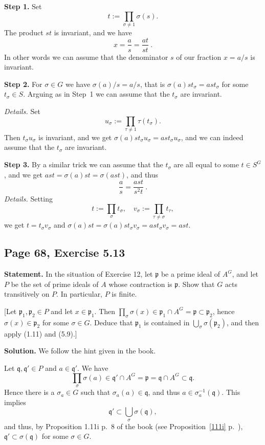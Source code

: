 \documentclass[parskip=half,fontsize=12pt]{scrartcl}%
\newcommand{\mf}{\mathfrak}
\newcommand{\ppp}{\mf p}
\newcommand{\qqq}{\mf q}
\begin{document}
\textbf{Step 1.} Set 
$$
t:=\prod_{\sigma\ne1}\sigma(s).
$$ 
The product $st$ is invariant, and we have 
$$
x=\frac{a}{s}=\frac{at}{st}\ .
$$ 
In other words we can assume that the denominator $s$ of our fraction $x=a/s$ is invariant.

\textbf{Step 2.} For $\sigma\in G$ we have $\sigma(a)/s=a/s$, that is $\sigma(a)st_\sigma=ast_\sigma$ for some $t_\sigma\in S$. Arguing as in Step~1 we can assume that the $t_\sigma$ are invariant. 

\emph{Details.} Set 
$$
u_\sigma:=\prod_{\tau\ne1}\tau(t_\sigma).
$$ 
Then $t_\sigma u_\sigma$ is invariant, and we get $\sigma(a)st_\sigma u_\sigma=ast_\sigma u_\sigma$, and we can indeed assume that the $t_\sigma$ are invariant.

\textbf{Step 3.} By a similar trick we can assume that the $t_\sigma$ are all equal to some $t\in S^G$, and we get $ast=\sigma(a)st=\sigma(ast)$, and thus 
$$
\frac{a}{s}=\frac{ast}{s^2t}\ .
$$ 
\emph{Details.} Setting 
$$
t:=\prod_\sigma t_\sigma,\quad v_\sigma:=\prod_{\tau\ne\sigma}t_\tau,
$$ 
we get $t=t_\sigma v_\sigma$ and $\sigma(a)st=\sigma(a)st_\sigma v_\sigma=ast_\sigma v_\sigma=ast$.

\subsection{Page 68, Exercise 5.13}%

\textbf{Statement.} In the situation of Exercise 12, let $\ppp$ be a prime ideal of $A^G$, and let $P$ be the set of prime ideals of $A$ whose contraction is $\ppp$. Show that $G$ acts transitively on $P$. In particular, $P$ is finite.

[Let $\ppp_1,\ppp_2\in P$ and let $x\in\ppp_1$. Then $\prod_\sigma\sigma(x)\in\ppp_1\cap A^G=\ppp\subset\ppp_2$, hence $\sigma(x)\in\ppp_2$ for some $\sigma\in G$. Deduce that $\ppp_1$ is contained in $\bigcup_\sigma\sigma(\ppp_2)$, and then apply (1.11) and (5.9).]

\textbf{Solution.} We follow the hint given in the book.

Let $\qqq,\qqq'\in P$ and $a\in\qqq'$. We have  
$$
\prod_\sigma\sigma(a)\in\qqq'\cap A^G=\ppp=\qqq\cap A^G\subset\qqq.
$$ 
Hence there is a $\sigma_a\in G$ such that $\sigma_a(a)\in\qqq$, and thus $a\in\sigma_a^{-1}(\qqq)$. This implies 
$$
\qqq'\subset\bigcup_\sigma\sigma(\qqq),
$$ 
and thus, by Proposition 1.11i p.~8 of the book (see Proposition~\ref{111i} p.~\pageref{111i}), $\qqq'\subset\sigma(\qqq)$ for some $\sigma\in G$. 
\end{document}
